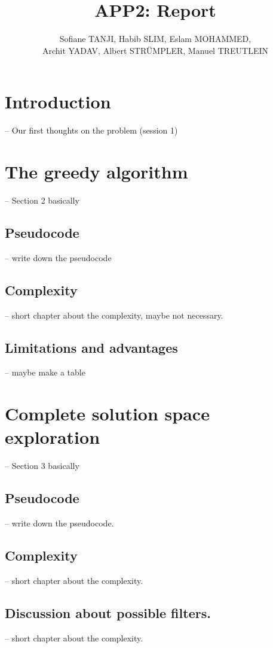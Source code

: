 \documentclass[parskip=full]{scrartcl}
\title{APP2: Report}
\author{Sofiane TANJI, Habib SLIM, Eslam MOHAMMED,\\ Archit YADAV, Albert STRÜMPLER, Manuel TREUTLEIN}
\begin{document}
\maketitle

\section{Introduction}
-- Our first thoughts on the problem (session 1)

\section{The greedy algorithm}
-- Section 2 basically

\subsection{Pseudocode}
-- write down the pseudocode

\subsection{Complexity}
-- short chapter about the complexity, maybe not necessary.

\subsection{Limitations and advantages}
-- maybe make a table


\section{Complete solution space exploration}
-- Section 3 basically

\subsection{Pseudocode}
-- write down the pseudocode. 

\subsection{Complexity}
-- short chapter about the complexity.

\subsection{Discussion about possible filters.}
-- short chapter about the complexity.

\printnoidxglossaries
\end{document}
